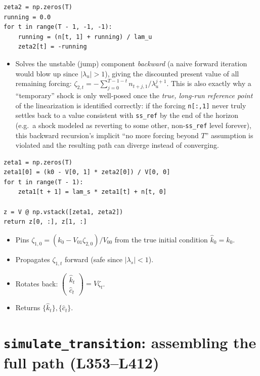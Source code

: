 \documentclass[11pt]{article}
\begin{document}
\begin{lstlisting}[firstnumber=338]
zeta2 = np.zeros(T)
running = 0.0
for t in range(T - 1, -1, -1):
    running = (n[t, 1] + running) / lam_u
    zeta2[t] = -running
\end{lstlisting}
\begin{itemize}
\item[\textbf{L338--L342}] Solves the unstable (jump) component
\emph{backward} (a naive forward iteration would blow up since
$|\lambda_u|>1$), giving the discounted present value of all remaining
forcing: $\zeta_{2,t}=-\sum_{j=0}^{T-1-t}n_{t+j,1}/\lambda_u^{j+1}$. This is
also exactly why a ``temporary'' shock is only well-posed once the
\emph{true, long-run reference point} of the linearization is identified
correctly: if the forcing \texttt{n[:,1]} never truly settles back to a
value consistent with \texttt{ss\_ref} by the end of the horizon (e.g.\ a
shock modeled as reverting to some other, non-\texttt{ss\_ref} level
forever), this backward recursion's implicit ``no more forcing beyond
$T$'' assumption is violated and the resulting path can diverge instead of
converging.
\end{itemize}

\begin{lstlisting}[firstnumber=344]
zeta1 = np.zeros(T)
zeta1[0] = (k0 - V[0, 1] * zeta2[0]) / V[0, 0]
for t in range(T - 1):
    zeta1[t + 1] = lam_s * zeta1[t] + n[t, 0]

z = V @ np.vstack([zeta1, zeta2])
return z[0, :], z[1, :]
\end{lstlisting}
\begin{itemize}
\item[\textbf{L344--L345}] Pins $\zeta_{1,0}=(k_0-V_{01}\zeta_{2,0})/V_{00}$
from the true initial condition $\hat k_0=k_0$.
\item[\textbf{L346--L347}] Propagates $\zeta_{1,t}$ forward (safe since
$|\lambda_s|<1$).
\item[\textbf{L349}] Rotates back: $\begin{pmatrix}\hat k_t\\\hat
c_t\end{pmatrix}=V\zeta_t$.
\item[\textbf{L350}] Returns $\{\hat k_t\},\{\hat c_t\}$.
\end{itemize}

\section{\texttt{simulate\_transition}: assembling the full path (L353--L412)}
\label{sec:transition}
\end{document}
